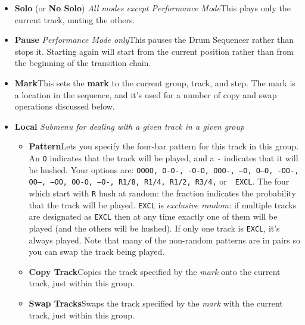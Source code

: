 \documentclass{article}
\newcommand\bump{\vspace{11in}}
\begin{document}
\begin{itemize}
\item {\bf Solo} (or {\bf No Solo}) {\it All modes except Performance Mode}\quad This plays only the current track, muting the others.
\item {\bf Pause} {\it Performance Mode only}\quad This pauses the Drum Sequencer rather than stops it.  Starting again will start from the current position rather than from the beginning of the transition chain.
\item {\bf Mark}\quad This sets the {\bf mark} to the current group, track, and step.  The mark is a location in the sequence, and it's used for a number of copy and swap operations discussed below.

\bump

\item {\bf Local} {\it Submenu for dealing with a given track in a given group} \quad 
\begin{itemize}
\item {\bf Pattern}\quad Lets you specify the four-bar pattern for this track in this group.  An {\tt O} indicates that the track will be played, and a {\tt -} indicates that it will be hushed.  Your options are: \texttt{OOOO, O-O-, -O-O, OOO-, ---O, O--O, -OO-, OO--, --OO, OO-O, --O-, R1/8, R1/4, R1/2, R3/4,} or\ \ {\tt EXCL}.  The four which start with {\tt R} hush at random: the fraction indicates the probability that the track will be played.  {\tt EXCL} is {\it exclusive random:} if multiple tracks are designated as {\tt EXCL} then at any time exactly one of them will be played (and the others will be hushed).  If only one track is {\tt EXCL}, it's always played.  Note that many of the non-random patterns are in pairs so you can swap the track being played.
\item {\bf Copy Track}\quad Copies the track specified by the {\it mark} onto the current track,  just within this group.
\item {\bf Swap Tracks}\quad Swaps the track specified by the {\it mark} with the current track, just within this group.
\end{itemize}


\end{itemize}
\end{document}
